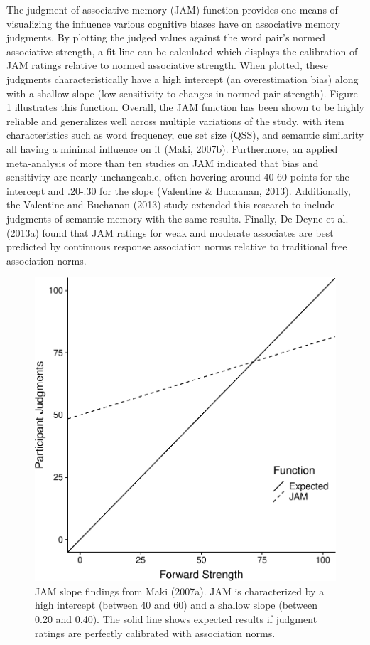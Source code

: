 \documentclass[english,,man]{apa6}
\begin{document}
The judgment of associative memory (JAM) function provides one means of visualizing the influence various cognitive biases have on associative memory judgments. By plotting the judged values against the word pair's normed associative strength, a fit line can be calculated which displays the calibration of JAM ratings relative to normed associative strength. When plotted, these judgments characteristically have a high intercept (an overestimation bias) along with a shallow slope (low sensitivity to changes in normed pair strength). Figure \ref{fig:makislope} illustrates this function. Overall, the JAM function has been shown to be highly reliable and generalizes well across multiple variations of the study, with item characteristics such as word frequency, cue set size (QSS), and semantic similarity all having a minimal influence on it (Maki, 2007b). Furthermore, an applied meta-analysis of more than ten studies on JAM indicated that bias and sensitivity are nearly unchangeable, often hovering around 40-60 points for the intercept and .20-.30 for the slope (Valentine \& Buchanan, 2013). Additionally, the Valentine and Buchanan (2013) study extended this research to include judgments of semantic memory with the same results. Finally, De Deyne et al. (2013a) found that JAM ratings for weak and moderate associates are best predicted by continuous response association norms relative to traditional free association norms.

\begin{figure}
\centering
\includegraphics{max_buch_JOL_files/figure-latex/makislope-1.pdf}
\caption{\label{fig:makislope}JAM slope findings from Maki (2007a). JAM is characterized by a high intercept (between 40 and 60) and a shallow slope (between 0.20 and 0.40). The solid line shows expected results if judgment ratings are perfectly calibrated with association norms.}
\end{figure}
\end{document}
